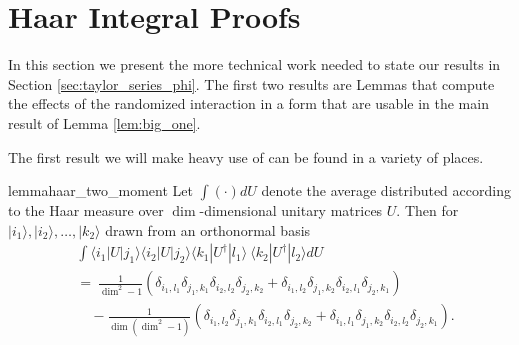 \documentclass{article}
\newcommand{\ket}[1]{|#1\rangle}
\newcommand{\bra}[1]{\langle #1|}
\newcommand{\parens}[1]{\left( #1 \right)}
\begin{document}
\section{Haar Integral Proofs} \label{sec:haar_integral_appendix}

In this section we present the more technical work needed to state our results in Section \ref{sec:taylor_series_phi}. The first two results are Lemmas that compute the effects of the randomized interaction in a form that are usable in the main result of Lemma \ref{lem:big_one}.

The first result we will make heavy use of can be found in a variety of places.
\begin{restatable}{lemma}{haar_two_moment} \label{lem:haar_two_moment}
    Let $\int (\cdot) dU$ denote the average distributed according to the Haar measure over $\dim$-dimensional unitary matrices $U$. Then for $\ket{i_1},\ket{i_2},\ldots,\ket{k_2}$ drawn from an orthonormal basis
    \begin{align}
        &\int \bra{i_1} U \ket{j_1} \bra{i_2} U \ket{j_2} \bra{k_1} U^\dagger \ket{l_1} ~ \bra{k_2} U^\dagger \ket{l_2} dU \nonumber \\
        &= ~\frac{1}{\dim^2 - 1} \parens{\delta_{i_1, l_1} \delta_{j_1, k_1} \delta_{i_2, l_2} \delta_{j_2, k_2} + \delta_{i_1, l_2} \delta_{j_1, k_2} \delta_{i_2, l_1} \delta_{j_2, k_1}} \nonumber \\
        &\quad - \frac{1}{\dim(\dim^2 - 1)} \parens{\delta_{i_1, l_2} \delta_{j_1, k_1} \delta_{i_2, l_1} \delta_{j_2, k_2} + \delta_{i_1, l_1} \delta_{j_1, k_2} \delta_{i_2, l_2} \delta_{j_2, k_1}}. \label{eq:haar_two_moment_integral}
    \end{align}
\end{restatable}
\end{document}
